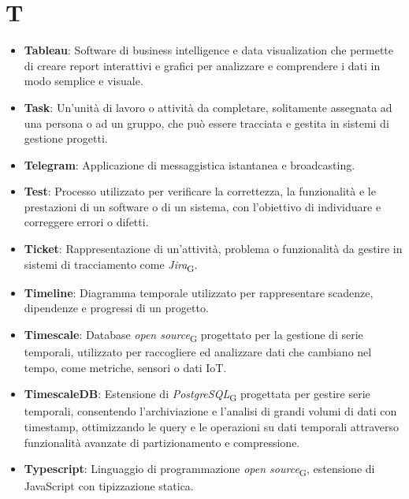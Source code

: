 \section{T}
\begin{itemize}
    \item \textbf{Tableau}: Software di business intelligence e data visualization che permette di creare report interattivi e grafici per analizzare e comprendere i dati in modo semplice e visuale.
    \item \textbf{Task}: Un'unità di lavoro o attività da completare, solitamente assegnata ad una persona o ad un gruppo, che può essere tracciata e gestita in sistemi di gestione progetti.
    \item \textbf{Telegram}: Applicazione di messaggistica istantanea e broadcasting.
    \item \textbf{Test}: Processo utilizzato per verificare la correttezza, la funzionalità e le prestazioni di un software o di un sistema, con l'obiettivo di individuare e correggere errori o difetti.
    \item \textbf{Ticket}: Rappresentazione di un’attività, problema o funzionalità da gestire in sistemi di tracciamento come \textit{Jira}\textsubscript{G}.
    \item \textbf{Timeline}: Diagramma temporale utilizzato per rappresentare scadenze, dipendenze e progressi di un progetto.
    \item \textbf{Timescale}: Database \textit{open source}\textsubscript{G} progettato per la gestione di serie temporali, utilizzato per raccogliere ed analizzare dati che cambiano nel tempo, come metriche, sensori o dati IoT.
    \item \textbf{TimescaleDB}: Estensione di \textit{PostgreSQL}\textsubscript{G} progettata per gestire serie temporali, consentendo l'archiviazione e l'analisi di grandi volumi di dati con timestamp, ottimizzando le query e le operazioni su dati temporali attraverso funzionalità avanzate di partizionamento e compressione.
    \item \textbf{Typescript}: Linguaggio di programmazione \textit{open source}\textsubscript{G}, estensione di JavaScript con tipizzazione statica.
\end{itemize}
